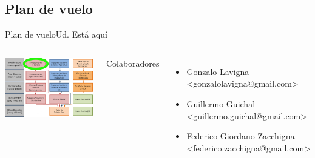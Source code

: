  \subsection{Plan de vuelo}
 \begin{frame}{Plan de vuelo}{Ud. Está aquí}
    \begin{columns}[onlytextwidth]
       \center\includegraphics[width=1.0\textwidth]{1_clase/Esquema_MSE}
       \normalsize{
          Colaboradores
          \begin{itemize}
             \item{Gonzalo Lavigna             \\ <gonzalolavigna@gmail.com>}
             \item{Guillermo Guichal           \\ <guillermo.guichal@gmail.com>}
             \item{Federico Giordano Zacchigna \\ <federico.zacchigna@gmail.com>}
          \end{itemize}
        }
    \end{columns}
    \vfill
 \end{frame}
